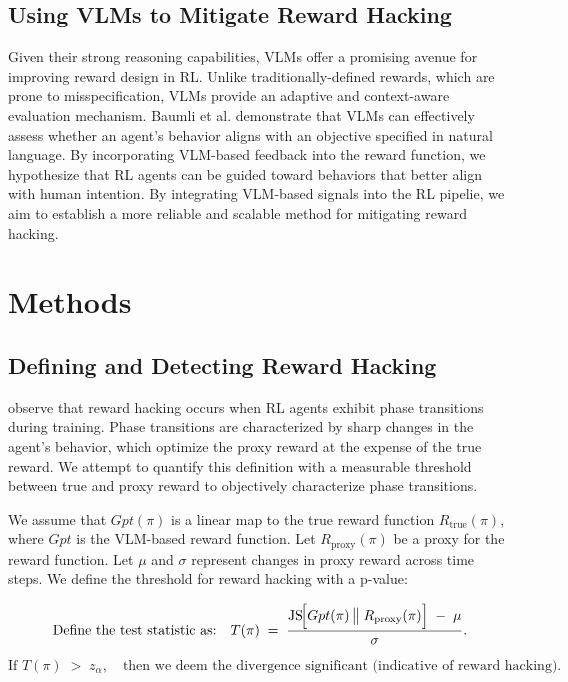 \documentclass{article}
\begin{document}
\subsection{Using VLMs to Mitigate Reward Hacking}
Given their strong reasoning capabilities, VLMs offer a promising avenue for improving reward design in RL. Unlike traditionally-defined rewards, which are prone to misspecification, VLMs provide an adaptive and context-aware evaluation mechanism. Baumli et al. demonstrate that VLMs can effectively assess whether an agent's behavior aligns with an objective specified in natural language. By incorporating VLM-based feedback into the reward function, we hypothesize that RL agents can be guided toward behaviors that better align with human intention. By integrating VLM-based signals into the RL pipelie, we aim to establish a more reliable and scalable method for mitigating reward hacking.

\section{Methods}

\subsection{Defining and Detecting Reward Hacking}
\cite{pan2022effectsrewardmisspecificationmapping} observe that reward hacking occurs when RL agents exhibit phase transitions during training. Phase transitions are characterized by sharp changes in the agent's behavior, which optimize the proxy reward at the expense of the true reward. We attempt to quantify this definition with a measurable threshold between true and proxy reward to objectively characterize phase transitions.

We assume that $Gpt(\pi)$ is a linear map to the true reward function $R_{\text{true}}(\pi)$, where $Gpt$ is the VLM-based reward function. Let $R_{\text{proxy}}(\pi)$ be a proxy for the reward function. Let $\mu$ and $\sigma$ represent changes in proxy reward across time steps. We define the threshold for reward hacking with a p-value:

\[
\text{Define the test statistic as:}
\quad
T(\pi)
\;=\;
\frac{
  \mathrm{JS}\!\Bigl[Gpt(\pi)\,\big\|\;R_{\mathrm{proxy}}(\pi)\Bigr] 
  \;-\; \mu
}{
  \sigma
}.
\]

\[
\text{If } T(\pi) \;>\; z_{\alpha},
\quad
\text{then we deem the divergence significant (indicative of reward hacking).}
\]
\end{document}
